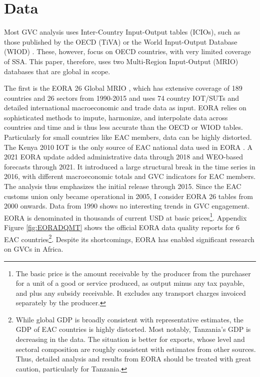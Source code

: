 \documentclass[a4paper]{article}
\begin{document}
\section{Data}

Most GVC analysis uses Inter-Country Input-Output tables (ICIOs), such as those published by the OECD (TiVA) or the World Input-Output Database (WIOD)  \citep{timmer2012world}. These, however, focus on OECD countries, with very limited coverage of SSA. This paper, therefore, uses two Multi-Region Input-Output (MRIO) databases that are global in scope. \newline 
 
The first is the EORA 26 Global MRIO \citep{lenzen2012mapping, lenzen2013building}, which has extensive coverage of 189 countries and 26 sectors from 1990-2015 and uses 74 country IOT/SUTs and detailed international macroeconomic and trade data as input. EORA relies on sophisticated methods to impute, harmonize, and interpolate data across countries and time and is thus less accurate than the OECD or WIOD tables. Particularly for small countries like EAC members, data can be highly distorted. The Kenya 2010 IOT is the only source of EAC national data used in EORA \citep{lenzen2013building}. A 2021 EORA update added administrative data through 2018 and WEO-based forecasts through 2021. It introduced a large structural break in the time series in 2016, with different macroeconomic totals and GVC indicators for EAC members. The analysis thus emphasizes the initial release through 2015. Since the EAC customs union only became operational in 2005, I consider EORA 26 tables from 2000 onwards. Data from 1990 shows no interesting trends in GVC engagement. EORA is denominated in thousands of current USD at basic prices\footnote{The basic price is the amount receivable by the producer from the purchaser for a unit of a good or service produced, as output minus any tax payable, and plus any subsidy receivable. It excludes any transport charges invoiced separately by the producer.}. Appendix Figure \ref{fig:EORADQMT} shows the official EORA data quality reports for 6 EAC countries\footnote{While global GDP is broadly consistent with representative estimates, the GDP of EAC countries is highly distorted. Most notably, Tanzania's GDP is decreasing in the data. The situation is better for exports, whose level and sectoral composition are roughly consistent with estimates from other sources. Thus, detailed analysis and results from EORA should be treated with great caution, particularly for Tanzania.}. Despite its shortcomings, EORA has enabled significant research on GVCs in Africa. \newline 
\end{document}
